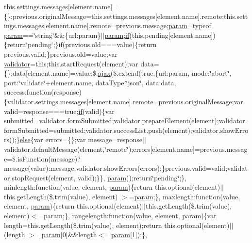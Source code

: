 \begin{DoxyCompactItemize}
this.\+settings.\+messages\mbox{[}element.\+name\mbox{]}=\{\};previous.\+original\+Message=this.\+settings.\+messages\mbox{[}element.\+name\mbox{]}.remote;this.\+settings.\+messages\mbox{[}element.\+name\mbox{]}.remote=previous.\+message;\hyperlink{_scripts_2jquery-1_810_82_8min_8js_ae8915303d11557d1b001bc56b6195251}{param}=typeof \hyperlink{_scripts_2jquery-1_810_82_8min_8js_ae8915303d11557d1b001bc56b6195251}{param}==\char`\"{}string\char`\"{}\&\&\{url\+:param\}$\vert$$\vert$\hyperlink{_scripts_2jquery-1_810_82_8min_8js_ae8915303d11557d1b001bc56b6195251}{param};\hyperlink{_scripts_2respond_8min_8js_a93851d60dd037a83509a1757b9ee7b66}{if}(this.\+pending\mbox{[}element.\+name\mbox{]})\{return\char`\"{}pending\char`\"{};\}if(previous.\+old===value)\{return previous.\+valid;\}previous.\+old=value;var \hyperlink{_scripts_2jquery_8validate_8js_a2dc8272bb221cdffcccbd20db038f172}{validator}=this;this.\+start\+Request(element);var data=\{\};data\mbox{[}element.\+name\mbox{]}=value;\$.\hyperlink{_scripts_2jquery_8validate_8js_a77004c0fdc08a5bc07afa0b099cdf6df}{ajax}(\$.extend(true,\{url\+:param, mode\+:\char`\"{}abort\char`\"{}, port\+:\char`\"{}validate\char`\"{}+element.\+name, data\+Type\+:\char`\"{}json\char`\"{}, data\+:data, success\+:function(response)\{validator.\+settings.\+messages\mbox{[}element.\+name\mbox{]}.remote=previous.\+original\+Message;var valid=response===true;\hyperlink{_scripts_2respond_8min_8js_a93851d60dd037a83509a1757b9ee7b66}{if}(valid)\{var submitted=validator.\+form\+Submitted;validator.\+prepare\+Element(element);validator.\+form\+Submitted=submitted;validator.\+success\+List.\+push(element);validator.\+show\+Errors();\}\hyperlink{_scripts_2jquery_8validate_8js_a0544c3fe466e421738dae463968b70ba}{else}\{var errors=\{\};var message=response$\vert$$\vert$validator.\+default\+Message(element,\char`\"{}remote\char`\"{});errors\mbox{[}element.\+name\mbox{]}=previous.\+message=\$.is\+Function(message)?message(value)\+:message;validator.\+show\+Errors(errors);\}previous.\+valid=valid;validator.\+stop\+Request(element, valid);\}\}, \hyperlink{_scripts_2jquery-1_810_82_8min_8js_ae8915303d11557d1b001bc56b6195251}{param}));return\char`\"{}pending\char`\"{};\}, minlength\+:function(value, element, \hyperlink{_scripts_2jquery-1_810_82_8min_8js_ae8915303d11557d1b001bc56b6195251}{param})\{return this.\+optional(element)$\vert$$\vert$this.\+get\+Length(\$.trim(value), element) $>$=\hyperlink{_scripts_2jquery-1_810_82_8min_8js_ae8915303d11557d1b001bc56b6195251}{param};\}, maxlength\+:function(value, element, \hyperlink{_scripts_2jquery-1_810_82_8min_8js_ae8915303d11557d1b001bc56b6195251}{param})\{return this.\+optional(element)$\vert$$\vert$this.\+get\+Length(\$.trim(value), element)$<$=\hyperlink{_scripts_2jquery-1_810_82_8min_8js_ae8915303d11557d1b001bc56b6195251}{param};\}, rangelength\+:function(value, element, \hyperlink{_scripts_2jquery-1_810_82_8min_8js_ae8915303d11557d1b001bc56b6195251}{param})\{var length=this.\+get\+Length(\$.trim(value), element);return this.\+optional(element)$\vert$$\vert$(length $>$=\hyperlink{_scripts_2jquery-1_810_82_8min_8js_ae8915303d11557d1b001bc56b6195251}{param}\mbox{[}0\mbox{]}\&\&length$<$=\hyperlink{_scripts_2jquery-1_810_82_8min_8js_ae8915303d11557d1b001bc56b6195251}{param}\mbox{[}1\mbox{]});\}, 
\end{DoxyCompactItemize}

